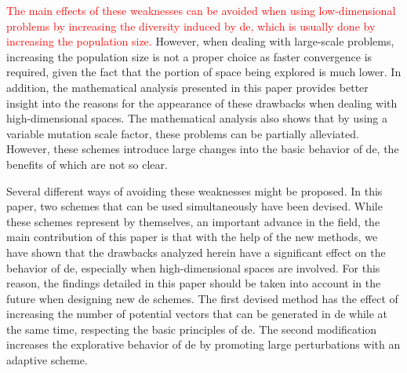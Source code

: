 \documentclass[review,3p]{elsarticle}
\newcommand{\DE}{{\sc de}}
\begin{document}
\textcolor{red}{
The main effects of these weaknesses can be avoided when using low-dimensional problems by 
increasing the diversity induced by \DE{}, which is usually done by increasing the
population size.
}
%
However, when dealing with large-scale problems, increasing the population size is not a proper choice
as faster convergence is required, given the fact that the portion of space being explored is much lower.
%
In addition, the mathematical analysis presented in this paper provides better insight into the reasons
for the appearance of these drawbacks when dealing with high-dimensional spaces.
%
The mathematical analysis also shows that by using a variable mutation
scale factor, these problems can be partially alleviated.
%
However, these schemes introduce large changes into the basic behavior of \DE{},
the benefits of which are not so clear.

Several different ways of avoiding these weaknesses might be proposed.
%
In this paper, two schemes that can be used simultaneously have been devised.
%
While these schemes represent by themselves, an important advance in the field,
the main contribution of this paper is that with the help of the new methods, we have
shown that the drawbacks analyzed herein have a significant effect on the behavior of \DE{}, especially when
high-dimensional spaces are involved.
%
For this reason, the findings detailed in this paper should be taken into account in the future when designing new \DE{} schemes.
%
The first devised method has the effect of increasing the number of potential vectors that can be
generated in \DE{} while at the same time, respecting the basic principles of \DE{}.
%
The second modification increases the explorative behavior of \DE{} by promoting large perturbations
with an adaptive scheme.
%
%
\end{document}
